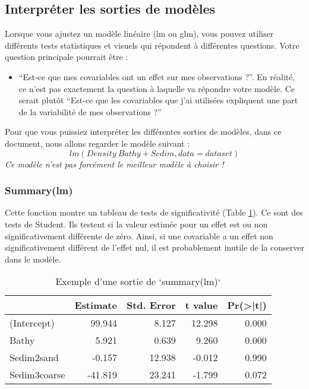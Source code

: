 \documentclass[french,a4paper]{article}
\providecommand{\tightlist}{%
  \setlength{\itemsep}{0pt}\setlength{\parskip}{0pt}}
\begin{document}
\hypertarget{interpreter-les-sorties-de-modeles}{%
\subsection{Interpréter les sorties de modèles}\label{interpreter-les-sorties-de-modeles}}

Lorsque vous ajustez un modèle linéaire (lm ou glm), vous pouvez utiliser différents tests statistiques et visuels qui répondent à différentes questions. Votre question principale pourrait être :

\begin{itemize}
\tightlist
\item
  ``Est-ce que mes covariables ont un effet sur mes observations ?''. En réalité, ce n'est pas exactement la question à laquelle va répondre votre modèle. Ce serait plutôt ``Est-ce que les covariables que j'ai utilisées expliquent une part de la variabilité de mes observations ?''
\end{itemize}

Pour que vous puissiez interpréter les différentes sorties de modèles, dans ce document, nous allons regarder le modèle suivant :
\[lm(Density ~ Bathy + Sedim, data = dataset)\]
\emph{Ce modèle n'est pas forcément le meilleur modèle à choisir !}

\hypertarget{summarylm}{%
\subsubsection{Summary(lm)}\label{summarylm}}

Cette fonction montre un tableau de tests de significativité (Table \ref{tab:RTableSummary}). Ce sont des tests de Student. Ils testent si la valeur estimée pour un effet est ou non significativement différente de zéro. Ainsi, si une covariable a un effet non significativement différent de l'effet nul, il est probablement inutile de la conserver dans le modèle.

\begin{table}[t]

\caption{\label{tab:RTableSummary}Exemple d'une sortie de `summary(lm)`}
\centering
\begin{tabular}{l|r|r|r|r}
\hline
  & Estimate & Std. Error & t value & Pr(>|t|)\\
\hline
(Intercept) & 99.944 & 8.127 & 12.298 & 0.000\\
\hline
Bathy & 5.921 & 0.639 & 9.260 & 0.000\\
\hline
Sedim2sand & -0.157 & 12.938 & -0.012 & 0.990\\
\hline
Sedim3coarse & -41.819 & 23.241 & -1.799 & 0.072\\
\hline
\end{tabular}
\end{table}
\end{document}
